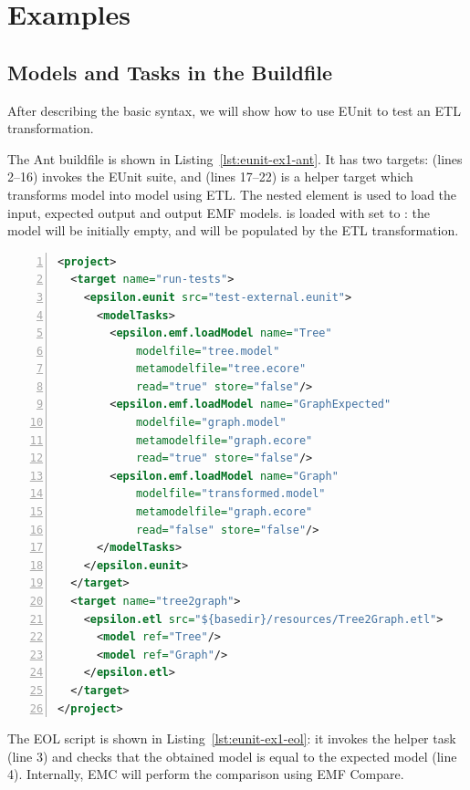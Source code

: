 \section{Examples}
\label{sec:eunit-examples}

\subsection{Models and Tasks in the Buildfile}
\label{sec:eunit-exampl-balanc-ant}

After describing the basic syntax, we will show how to use EUnit to test an ETL transformation.

The Ant buildfile is shown in Listing~\ref{lst:eunit-ex1-ant}. It has two targets:  (lines 2--16) invokes the EUnit suite, and  (lines 17--22) is a helper target which transforms model  into model  using ETL. The  nested element is used to load the input, expected output and output EMF models.  is loaded with  set to : the model will be initially empty, and will be populated by the ETL transformation.

\begin{lstlisting}[language=XML, numbers=left, caption=Ant buildfile for EUnit with \xmlelement{modelTasks} and a helper target, label=lst:eunit-ex1-ant,float]
<project>
  <target name="run-tests">
    <epsilon.eunit src="test-external.eunit">
      <modelTasks>
        <epsilon.emf.loadModel name="Tree"
            modelfile="tree.model"
            metamodelfile="tree.ecore"
            read="true" store="false"/>
        <epsilon.emf.loadModel name="GraphExpected"
            modelfile="graph.model"
            metamodelfile="graph.ecore"
            read="true" store="false"/>
        <epsilon.emf.loadModel name="Graph"
            modelfile="transformed.model"
            metamodelfile="graph.ecore"
            read="false" store="false"/>
      </modelTasks>
    </epsilon.eunit>
  </target>
  <target name="tree2graph">
    <epsilon.etl src="${basedir}/resources/Tree2Graph.etl">
      <model ref="Tree"/>
      <model ref="Graph"/>
    </epsilon.etl>
  </target>
</project>
\end{lstlisting}

The EOL script is shown in Listing~\ref{lst:eunit-ex1-eol}: it invokes the helper task (line 3) and checks that the obtained model is equal to the expected model (line 4). Internally, EMC will perform the comparison using EMF Compare.

